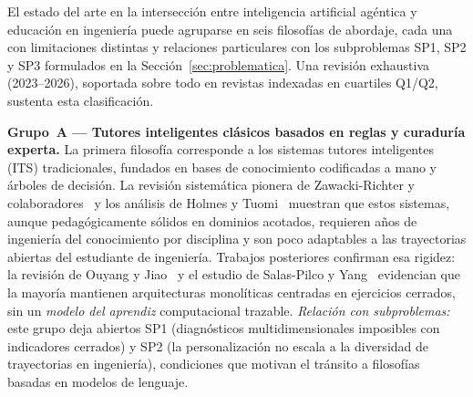 

El estado del arte en la intersección entre inteligencia artificial agéntica y educación en ingeniería puede agruparse en seis filosofías de abordaje, cada una con limitaciones distintas y relaciones particulares con los subproblemas SP1, SP2 y SP3 formulados en la Sección~\ref{sec:problematica}. Una revisión exhaustiva (2023--2026), soportada sobre todo en revistas indexadas en cuartiles Q1/Q2, sustenta esta clasificación.

\textbf{Grupo~A — Tutores inteligentes clásicos basados en reglas y curaduría experta.}
La primera filosofía corresponde a los sistemas tutores inteligentes (ITS) tradicionales, fundados en bases de conocimiento codificadas a mano y árboles de decisión. La revisión sistemática pionera de Zawacki-Richter y colaboradores~\cite{zawacki2019systematic} y los análisis de Holmes y Tuomi~\cite{holmes2022state} muestran que estos sistemas, aunque pedagógicamente sólidos en dominios acotados, requieren años de ingeniería del conocimiento por disciplina y son poco adaptables a las trayectorias abiertas del estudiante de ingeniería. Trabajos posteriores confirman esa rigidez: la revisión de Ouyang y Jiao~\cite{ouyang2021its} y el estudio de Salas-Pilco y Yang~\cite{salaspilco2022ai} evidencian que la mayoría mantienen arquitecturas monolíticas centradas en ejercicios cerrados, sin un \emph{modelo del aprendiz} computacional trazable. \emph{Relación con subproblemas:} este grupo deja abiertos SP1 (diagnósticos multidimensionales imposibles con indicadores cerrados) y SP2 (la personalización no escala a la diversidad de trayectorias en ingeniería), condiciones que motivan el tránsito a filosofías basadas en modelos de lenguaje.


